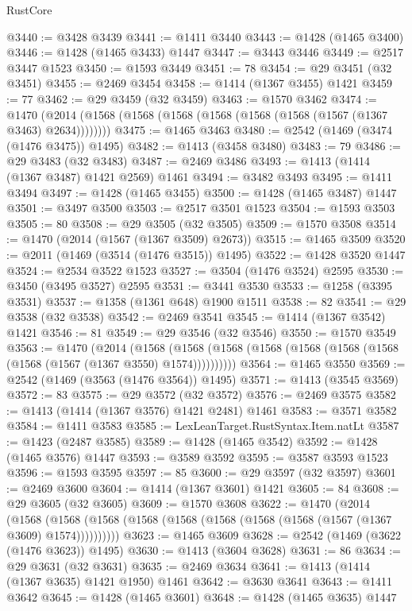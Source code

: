 \begin{lexlean}{RustCore}
\begin{coremodule}
@3440 := @3428 @3439
@3441 := @1411 @3440
@3443 := @1428 (@1465 @3400)
@3446 := @1428 (@1465 @3433) @1447
@3447 := @3443 @3446
@3449 := @2517 @3447 @1523
@3450 := @1593 @3449
@3451 := 78
@3454 := @29 @3451 (@32 @3451)
@3455 := @2469 @3454
@3458 := @1414 (@1367 @3455) @1421
@3459 := 77
@3462 := @29 @3459 (@32 @3459)
@3463 := @1570 @3462
@3474 := @1470 (@2014 (@1568 (@1568 (@1568 (@1568 (@1568 (@1568 (@1567 (@1367 @3463) @2634))))))))
@3475 := @1465 @3463
@3480 := @2542 (@1469 (@3474 (@1476 @3475)) @1495)
@3482 := @1413 (@3458 @3480)
@3483 := 79
@3486 := @29 @3483 (@32 @3483)
@3487 := @2469 @3486
@3493 := @1413 (@1414 (@1367 @3487) @1421 @2569) @1461
@3494 := @3482 @3493
@3495 := @1411 @3494
@3497 := @1428 (@1465 @3455)
@3500 := @1428 (@1465 @3487) @1447
@3501 := @3497 @3500
@3503 := @2517 @3501 @1523
@3504 := @1593 @3503
@3505 := 80
@3508 := @29 @3505 (@32 @3505)
@3509 := @1570 @3508
@3514 := @1470 (@2014 (@1567 (@1367 @3509) @2673))
@3515 := @1465 @3509
@3520 := @2011 (@1469 (@3514 (@1476 @3515)) @1495)
@3522 := @1428 @3520 @1447
@3524 := @2534 @3522 @1523
@3527 := @3504 (@1476 @3524) @2595
@3530 := @3450 (@3495 @3527) @2595
@3531 := @3441 @3530
@3533 := @1258 (@3395 @3531)
@3537 := @1358 (@1361 @648) @1900 @1511
@3538 := 82
@3541 := @29 @3538 (@32 @3538)
@3542 := @2469 @3541
@3545 := @1414 (@1367 @3542) @1421
@3546 := 81
@3549 := @29 @3546 (@32 @3546)
@3550 := @1570 @3549
@3563 := @1470
    (@2014
      (@1568 (@1568 (@1568 (@1568 (@1568 (@1568 (@1568 (@1568 (@1567 (@1367 @3550) @1574))))))))))
@3564 := @1465 @3550
@3569 := @2542 (@1469 (@3563 (@1476 @3564)) @1495)
@3571 := @1413 (@3545 @3569)
@3572 := 83
@3575 := @29 @3572 (@32 @3572)
@3576 := @2469 @3575
@3582 := @1413 (@1414 (@1367 @3576) @1421 @2481) @1461
@3583 := @3571 @3582
@3584 := @1411 @3583
@3585 := LexLeanTarget.RustSyntax.Item.natLt
@3587 := @1423 (@2487 @3585)
@3589 := @1428 (@1465 @3542)
@3592 := @1428 (@1465 @3576) @1447
@3593 := @3589 @3592
@3595 := @3587 @3593 @1523
@3596 := @1593 @3595
@3597 := 85
@3600 := @29 @3597 (@32 @3597)
@3601 := @2469 @3600
@3604 := @1414 (@1367 @3601) @1421
@3605 := 84
@3608 := @29 @3605 (@32 @3605)
@3609 := @1570 @3608
@3622 := @1470
    (@2014
      (@1568 (@1568 (@1568 (@1568 (@1568 (@1568 (@1568 (@1568 (@1567 (@1367 @3609) @1574))))))))))
@3623 := @1465 @3609
@3628 := @2542 (@1469 (@3622 (@1476 @3623)) @1495)
@3630 := @1413 (@3604 @3628)
@3631 := 86
@3634 := @29 @3631 (@32 @3631)
@3635 := @2469 @3634
@3641 := @1413 (@1414 (@1367 @3635) @1421 @1950) @1461
@3642 := @3630 @3641
@3643 := @1411 @3642
@3645 := @1428 (@1465 @3601)
@3648 := @1428 (@1465 @3635) @1447

\end{coremodule}
\end{lexlean}
